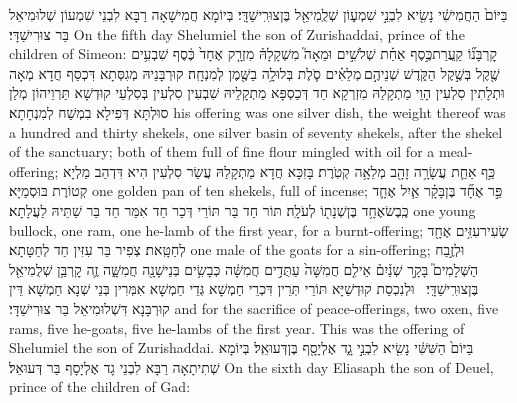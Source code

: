 {בַּיּוֹם֙ הַחֲמִישִׁ֔י נָשִׂ֖יא לִבְנֵ֣י שִׁמְע֑וֹן שְׁלֻֽמִיאֵ֖ל בֶּן\maqqaf צוּרִֽישַׁדָּֽי׃}
{בְּיוֹמָא חֲמִישָׁאָה רַבָּא לִבְנֵי שִׁמְעוֹן שְׁלוּמִיאֵל בַּר צוּרִישַׁדָּי׃}
{On the fifth day Shelumiel the son of Zurishaddai, prince of the children of Simeon:}{}
{קׇרְבָּנ֞וֹ קַֽעֲרַת\maqqaf כֶּ֣סֶף אַחַ֗ת שְׁלֹשִׁ֣ים וּמֵאָה֮ מִשְׁקָלָהּ֒ מִזְרָ֤ק אֶחָד֙ כֶּ֔סֶף שִׁבְעִ֥ים שֶׁ֖קֶל בְּשֶׁ֣קֶל הַקֹּ֑דֶשׁ שְׁנֵיהֶ֣ם \legarmeh  מְלֵאִ֗ים סֹ֛לֶת בְּלוּלָ֥ה בַשֶּׁ֖מֶן לְמִנְחָֽה׃}
{קוּרְבָּנֵיהּ מְגִסְּתָא דִּכְסַף חֲדָא מְאָה וּתְלָתִין סִלְעִין הָוֵי מַתְקָלַהּ מִזְרְקָא חַד דְּכַסְפָּא מַתְקָלֵיהּ שִׁבְעִין סִלְעִין בְּסִלְעֵי קוּדְשָׁא תַּרְוֵיהוֹן מְלַן סוּלְתָּא דְּפִילָא בִמְשַׁח לְמִנְחָתָא׃}
{his offering was one silver dish, the weight thereof was a hundred and thirty shekels, one silver basin of seventy shekels, after the shekel of the sanctuary; both of them full of fine flour mingled with oil for a meal-offering;}{}
{כַּ֥ף אַחַ֛ת עֲשָׂרָ֥ה זָהָ֖ב מְלֵאָ֥ה קְטֹֽרֶת׃}
{בָּזִכָּא חֲדָא מַתְקָלַהּ עֲשַׂר סִלְעִין הִיא דִּדְהַב מַלְיָא קְטוֹרֶת בּוּסְמַיָּא׃}
{one golden pan of ten shekels, full of incense;}{}
{פַּ֣ר אֶחָ֞ד בֶּן\maqqaf בָּקָ֗ר אַ֧יִל אֶחָ֛ד כֶּֽבֶשׂ\maqqaf אֶחָ֥ד בֶּן\maqqaf שְׁנָת֖וֹ לְעֹלָֽה׃}
{תּוֹר חַד בַּר תּוֹרֵי דְּכַר חַד אִמַּר חַד בַּר שַׁתֵּיהּ לַעֲלָתָא׃}
{one young bullock, one ram, one he-lamb of the first year, for a burnt-offering;}{}
{שְׂעִיר\maqqaf עִזִּ֥ים אֶחָ֖ד לְחַטָּֽאת׃}
{צְפִיר בַּר עִזִּין חַד לְחַטָּתָא׃}
{one male of the goats for a sin-offering;}{}
{וּלְזֶ֣בַח הַשְּׁלָמִים֮ בָּקָ֣ר שְׁנַ֒יִם֒ אֵילִ֤ם חֲמִשָּׁה֙ עַתֻּדִ֣ים חֲמִשָּׁ֔ה כְּבָשִׂ֥ים בְּנֵי\maqqaf שָׁנָ֖ה חֲמִשָּׁ֑ה זֶ֛ה קׇרְבַּ֥ן שְׁלֻמִיאֵ֖ל בֶּן\maqqaf צוּרִֽישַׁדָּֽי׃ \petucha }
{וּלְנִכְסַת קוּדְשַׁיָּא תּוֹרֵי תְּרֵין דִּכְרֵי חַמְשָׁא גְּדֵי חַמְשָׁא אִמְּרִין בְּנֵי שְׁנָא חַמְשָׁא דֵּין קוּרְבָּנָא דִּשְׁלוּמִיאֵל בַּר צוּרִישַׁדָּי׃}
{and for the sacrifice of peace-offerings, two oxen, five rams, five he-goats, five he-lambs of the first year. This was the offering of Shelumiel the son of Zurishaddai.}{}
{בַּיּוֹם֙ הַשִּׁשִּׁ֔י נָשִׂ֖יא לִבְנֵ֣י גָ֑ד אֶלְיָסָ֖ף בֶּן\maqqaf דְּעוּאֵֽל׃}
{בְּיוֹמָא שְׁתִיתָאָה רַבָּא לִבְנֵי גָד אֶלְיָסָף בַּר דְּעוּאֵל׃}
{On the sixth day Eliasaph the son of Deuel, prince of the children of Gad:}{}
